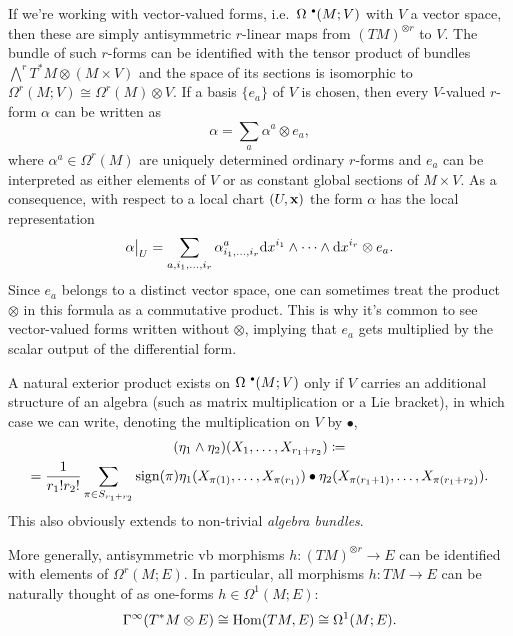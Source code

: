 \begin{example}
    If we're working with vector-valued forms, i.e.~$\Omega^{\smbullet }(M;V)$ with $V$ a vector space, then these are simply antisymmetric $r$-linear maps from $(TM)^{\otimes r}$ to $V$. The bundle of such $r$-forms can be identified with the tensor product of bundles $\bigwedge^r T^\ast M\otimes (M\times V)$ and the space of its sections is isomorphic to $\Omega^r(M;V)\cong \Omega^r(M)\otimes V$. If a basis $\{e_a\}$ of $V$ is chosen, then every $V$-valued $r$-form $\alpha$ can be written as
    \[\alpha=\sum_a \alpha^a\otimes e_a,\]
    where $\alpha^a\in \Omega^r(M)$ are uniquely determined ordinary $r$-forms and $e_a$ can be interpreted as either elements of $V$ or as constant global sections of $M\times V$. As a consequence, with respect to a local chart $(U,\bf{x})$ the form $\alpha$ has the local representation
    \[\restr{\alpha}{U}=\sum_{a,i_1,\ldots,i_r}\alpha^a_{i_1,\ldots,i_r}\dd x^{i_1}\wedge\cdots\wedge\dd x^{i_r}\otimes e_a.\]
    Since $e_a$ belongs to a distinct vector space, one can sometimes treat the product $\otimes$ in this formula as a commutative product. This is why it's common to see vector-valued forms written without $\otimes$, implying that $e_a$ gets multiplied by the scalar output of the differential form.

    A natural exterior product exists on $\Omega^{\smbullet }(M;V)$ only if $V$ carries an additional structure of an algebra (such as matrix multiplication or a Lie bracket), in which case we can write, denoting the multiplication on $V$ by $\bullet$,
    \begin{multline}
        (\eta_1\wedge\eta_2)(X_1,\ldots,X_{r_1+r_2})\coloneqq \\
        =\frac{1}{r_1!r_2!}\sum_{\pi\in S_{r_1+r_2}}\sign(\pi)\eta_1(X_{\pi(1)},\ldots,X_{\pi(r_1)})\bullet \eta_2(X_{\pi(r_1+1)},\ldots,X_{\pi(r_1+r_2)}).\label{eq 2.4.17 RS1}
    \end{multline}
    This also obviously extends to non-trivial \emph{algebra bundles}.
\end{example}

\begin{example}
    More generally, antisymmetric \gls{vb} morphisms $h:(TM)^{\otimes r}\to E$ can be identified with elements of $\Omega^r(M;E)$. In particular, all morphisms $h:TM\to E$ can be naturally thought of as one-forms $h\in\Omega^1(M;E)$:
    \[\Gamma^\infty(T^\ast M\otimes E)\cong \Hom(TM,E)\cong \Omega^1(M;E).\]
\end{example}


